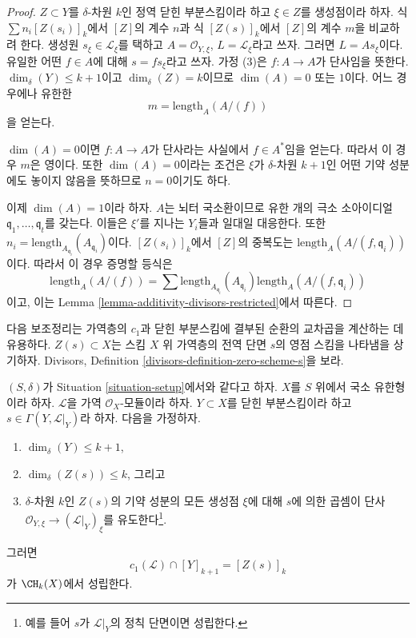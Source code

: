 \begin{proof}
$Z \subset Y$를 $\delta$-차원 $k$인 정역 닫힌 부분스킴이라 하고
$\xi \in Z$를 생성점이라 하자. 식 $\sum n_i[Z(s_i)]_k$에서 $[Z]$의
계수 $n$과 식 $[Z(s)]_k$에서 $[Z]$의 계수 $m$을 비교하려 한다.
생성원 $s_\xi \in \mathcal{L}_\xi$를 택하고
$A = \mathcal{O}_{Y, \xi}$, $L = \mathcal{L}_\xi$라고 쓰자.
그러면 $L = As_\xi$이다. 유일한 어떤 $f \in A$에 대해
$s = f s_\xi$라고 쓰자. 가정 (3)은 $f : A \to A$가 단사임을 뜻한다.
$\dim_\delta(Y) \leq k + 1$이고 $\dim_\delta(Z) = k$이므로
$\dim(A) = 0$ 또는 $1$이다. 어느 경우에나 유한한
$$
m = \text{length}_A(A/(f))
$$
을 얻는다.

\medskip\noindent
$\dim(A) = 0$이면 $f : A \to A$가 단사라는 사실에서 $f \in A^*$임을
얻는다. 따라서 이 경우 $m$은 영이다. 또한 $\dim(A) = 0$이라는 조건은
$\xi$가 $\delta$-차원 $k + 1$인 어떤 기약 성분에도 놓이지 않음을
뜻하므로 $n = 0$이기도 하다.

\medskip\noindent
이제 $\dim(A) = 1$이라 하자. $A$는 뇌터 국소환이므로 유한 개의 극소
소아이디얼 $\mathfrak q_1, \ldots, \mathfrak q_t$를 갖는다. 이들은
$\xi'$를 지나는 $Y_i$들과 일대일 대응한다. 또한
$n_i = \text{length}_{A_{\mathfrak q_i}}(A_{\mathfrak q_i})$이다.
$[Z(s_i)]_k$에서 $[Z]$의 중복도는
$\text{length}_A(A/(f, \mathfrak q_i))$이다. 따라서 이 경우 증명할
등식은
$$
\text{length}_A(A/(f))
=
\sum \text{length}_{A_{\mathfrak q_i}}(A_{\mathfrak q_i})
\text{length}_A(A/(f, \mathfrak q_i))
$$
이고, 이는 Lemma \ref{lemma-additivity-divisors-restricted}에서 따른다.
\end{proof}

\noindent
다음 보조정리는 가역층의 $c_1$과 닫힌 부분스킴에 결부된 순환의
교차곱을 계산하는 데 유용하다. $Z(s) \subset X$는 스킴 $X$ 위
가역층의 전역 단면 $s$의 영점 스킴을 나타냄을 상기하자. Divisors,
Definition \ref{divisors-definition-zero-scheme-s}을 보라.

\begin{lemma}
\label{lemma-geometric-cap}
$(S, \delta)$가 Situation \ref{situation-setup}에서와 같다고 하자.
$X$를 $S$ 위에서 국소 유한형이라 하자. $\mathcal{L}$을 가역
$\mathcal{O}_X$-모듈이라 하자. $Y \subset X$를 닫힌 부분스킴이라 하고
$s \in \Gamma(Y, \mathcal{L}|_Y)$라 하자. 다음을 가정하자.
\begin{enumerate}
\item $\dim_\delta(Y) \leq k + 1$,
\item $\dim_\delta(Z(s)) \leq k$, 그리고
\item $\delta$-차원 $k$인 $Z(s)$의 기약 성분의 모든 생성점 $\xi$에
대해 $s$에 의한 곱셈이 단사
$\mathcal{O}_{Y, \xi} \to (\mathcal{L}|_Y)_\xi$를 유도한다\footnote{예를
들어 $s$가 $\mathcal{L}|_Y$의 정칙 단면이면 성립한다.}.
\end{enumerate}
그러면
$$
c_1(\mathcal{L}) \cap [Y]_{k + 1} = [Z(s)]_k
$$
가 $\CH_k(X)$에서 성립한다.
\end{lemma}

